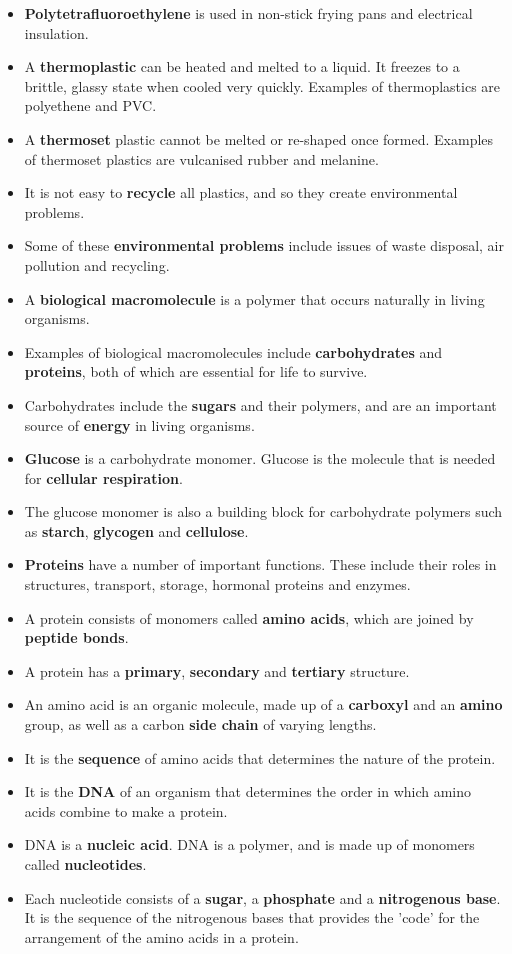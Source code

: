 \begin{itemize}
\item{\textbf{Polytetrafluoroethylene} is used in non-stick frying pans and electrical insulation.}
\item{A \textbf{thermoplastic} can be heated and melted to a liquid. It freezes to a brittle, glassy state when cooled very quickly. Examples of thermoplastics are polyethene and PVC.}
\item{A \textbf{thermoset} plastic cannot be melted or re-shaped once formed. Examples of thermoset plastics are vulcanised rubber and melanine.}
\item{It is not easy to \textbf{recycle} all plastics, and so they create environmental problems.}
\item{Some of these \textbf{environmental problems} include issues of waste disposal, air pollution and recycling.}
\item{A \textbf{biological macromolecule} is a polymer that occurs naturally in living organisms.}
\item{Examples of biological macromolecules include \textbf{carbohydrates} and \textbf{proteins}, both of which are essential for life to survive.}
\item{Carbohydrates include the \textbf{sugars} and their polymers, and are an important source of \textbf{energy} in living organisms.}
\item{\textbf{Glucose} is a carbohydrate monomer. Glucose is the molecule that is needed for \textbf{cellular respiration}.}
\item{The glucose monomer is also a building block for carbohydrate polymers such as \textbf{starch}, \textbf{glycogen} and \textbf{cellulose}.}
\item{\textbf{Proteins} have a number of important functions. These include their roles in structures, transport, storage, hormonal proteins and enzymes.}
\item{A protein consists of monomers called \textbf{amino acids}, which are joined by \textbf{peptide bonds}.}
\item{A protein has a \textbf{primary}, \textbf{secondary} and \textbf{tertiary} structure.}
\item{An amino acid is an organic molecule, made up of a \textbf{carboxyl} and an \textbf{amino} group, as well as a carbon \textbf{side chain} of varying lengths.} 
\item{It is the \textbf{sequence} of amino acids that determines the nature of the protein.}
\item{It is the \textbf{DNA} of an organism that determines the order in which amino acids combine to make a protein.}
\item{DNA is a \textbf{nucleic acid}. DNA is a polymer, and is made up of monomers called \textbf{nucleotides}.}
\item{Each nucleotide consists of a \textbf{sugar}, a \textbf{phosphate} and a \textbf{nitrogenous base}. It is the sequence of the nitrogenous bases that provides the 'code' for the arrangement of the amino acids in a protein. }
\end{itemize}


